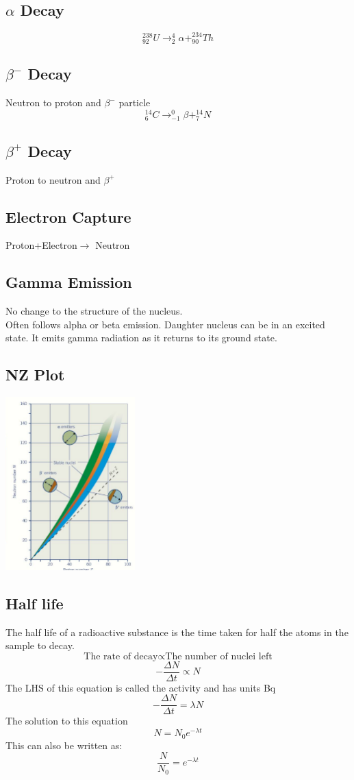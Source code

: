 \documentclass{article}[18pt]
\begin{document}
\subsection{$\alpha$ Decay}
$$^{238}_{92}U\rightarrow^4_2\alpha+^{234}_{90}Th$$
\subsection{$\beta^-$ Decay}
Neutron to proton and $\beta^-$ particle
$$^{14}_6C\rightarrow^0_{-1}\beta+^{14}_7N$$
\subsection{$\beta^+$ Decay}
Proton to neutron and $\beta^+$
\subsection{Electron Capture}
Proton+Electron$\rightarrow$ Neutron
\subsection{Gamma Emission}
No change to the structure of the nucleus.\\
Often follows alpha or beta emission. Daughter nucleus can be in an excited state. It emits gamma radiation as it returns to its ground state.
\subsection{NZ Plot}
\includegraphics[width=5cm]{nz_plot.png} 
\subsection{Half life}
The half life of a radioactive substance is the time taken for half the atoms in the sample to decay.
$$\textrm{The rate of decay}\propto\textrm{The number of nuclei left}$$
$$-\frac{\Delta N}{\Delta t}\propto N$$
The LHS of this equation is called the activity and has units Bq
$$-\frac{\Delta N}{\Delta t}=\lambda N$$
The solution to this equation
$$N=N_0e^{-\lambda t}$$
This can also be written as:
$$\frac{N}{N_0}=e^{-\lambda t}$$
\end{document}
